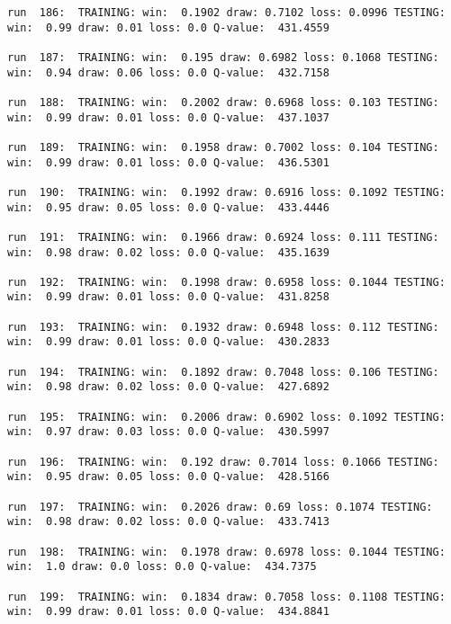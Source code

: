 \documentclass[11pt]{article}
\begin{document}
\begin{Verbatim}[commandchars=\\\{\}]
run  186:  TRAINING: win:  0.1902 draw: 0.7102 loss: 0.0996 TESTING: win:  0.99 draw: 0.01 loss: 0.0 Q-value:  431.4559

run  187:  TRAINING: win:  0.195 draw: 0.6982 loss: 0.1068 TESTING: win:  0.94 draw: 0.06 loss: 0.0 Q-value:  432.7158

run  188:  TRAINING: win:  0.2002 draw: 0.6968 loss: 0.103 TESTING: win:  0.99 draw: 0.01 loss: 0.0 Q-value:  437.1037

run  189:  TRAINING: win:  0.1958 draw: 0.7002 loss: 0.104 TESTING: win:  0.99 draw: 0.01 loss: 0.0 Q-value:  436.5301

run  190:  TRAINING: win:  0.1992 draw: 0.6916 loss: 0.1092 TESTING: win:  0.95 draw: 0.05 loss: 0.0 Q-value:  433.4446

run  191:  TRAINING: win:  0.1966 draw: 0.6924 loss: 0.111 TESTING: win:  0.98 draw: 0.02 loss: 0.0 Q-value:  435.1639

run  192:  TRAINING: win:  0.1998 draw: 0.6958 loss: 0.1044 TESTING: win:  0.99 draw: 0.01 loss: 0.0 Q-value:  431.8258

run  193:  TRAINING: win:  0.1932 draw: 0.6948 loss: 0.112 TESTING: win:  0.99 draw: 0.01 loss: 0.0 Q-value:  430.2833

run  194:  TRAINING: win:  0.1892 draw: 0.7048 loss: 0.106 TESTING: win:  0.98 draw: 0.02 loss: 0.0 Q-value:  427.6892

run  195:  TRAINING: win:  0.2006 draw: 0.6902 loss: 0.1092 TESTING: win:  0.97 draw: 0.03 loss: 0.0 Q-value:  430.5997

run  196:  TRAINING: win:  0.192 draw: 0.7014 loss: 0.1066 TESTING: win:  0.95 draw: 0.05 loss: 0.0 Q-value:  428.5166

run  197:  TRAINING: win:  0.2026 draw: 0.69 loss: 0.1074 TESTING: win:  0.98 draw: 0.02 loss: 0.0 Q-value:  433.7413

run  198:  TRAINING: win:  0.1978 draw: 0.6978 loss: 0.1044 TESTING: win:  1.0 draw: 0.0 loss: 0.0 Q-value:  434.7375

run  199:  TRAINING: win:  0.1834 draw: 0.7058 loss: 0.1108 TESTING: win:  0.99 draw: 0.01 loss: 0.0 Q-value:  434.8841

    \end{Verbatim}
\end{document}
